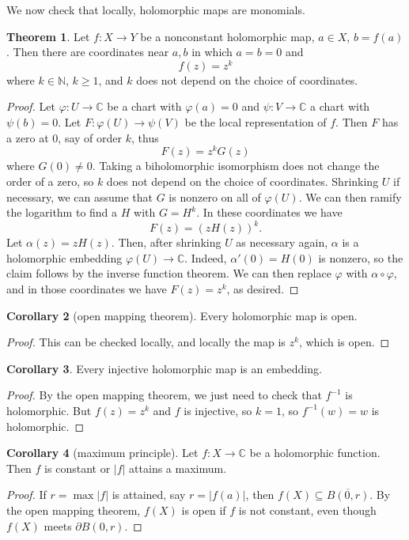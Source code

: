 \documentclass[12pt]{book}
\newcommand{\NN}{\mathbb{N}}
\newcommand{\CC}{\mathbb{C}}
\theoremstyle{definition}
\newtheorem{theorem}{Theorem}[chapter]
\newtheorem{corollary}[theorem]{Corollary}
\begin{document}
We now check that locally, holomorphic maps are monomials.

\begin{theorem}
Let $f: X \to Y$ be a nonconstant holomorphic map, $a \in X$, $b = f(a)$.
Then there are coordinates near $a,b$ in which $a = b = 0$ and
$$f(z) = z^k$$
where $k \in \NN$, $k \geq 1$, and $k$ does not depend on the choice of coordinates.
\end{theorem}
\begin{proof}
Let $\varphi: U \to \CC$ be a chart with $\varphi(a) = 0$ and $\psi: V \to \CC$ a chart with $\psi(b) = 0$.
Let $F: \varphi(U) \to \psi(V)$ be the local representation of $f$.
Then $F$ has a zero at $0$, say of order $k$, thus
$$F(z) = z^k G(z)$$
where $G(0) \neq 0$. Taking a biholomorphic isomorphism does not change the order of a zero, so $k$ does not depend on the choice of coordinates.
Shrinking $U$ if necessary, we can assume that $G$ is nonzero on all of $\varphi(U)$.
We can then ramify the logarithm to find a $H$ with $G = H^k$.
In these coordinates we have
$$F(z) = (zH(z))^k.$$
Let $\alpha(z) = zH(z)$. Then, after shrinking $U$ as necessary again, $\alpha$ is a holomorphic embedding $\varphi(U) \to \CC$.
Indeed, $\alpha'(0) = H(0)$ is nonzero, so the claim follows by the inverse function theorem.
We can then replace $\varphi$ with $\alpha \circ \varphi$, and in those coordinates we have $F(z) = z^k$, as desired.
\end{proof}

\begin{corollary}[open mapping theorem]
Every holomorphic map is open.
\end{corollary}
\begin{proof}
This can be checked locally, and locally the map is $z^k$, which is open.
\end{proof}

\begin{corollary}
Every injective holomorphic map is an embedding.
\end{corollary}
\begin{proof}
By the open mapping theorem, we just need to check that $f^{-1}$ is holomorphic.
But $f(z) = z^k$ and $f$ is injective, so $k = 1$, so $f^{-1}(w) = w$ is holomorphic.
\end{proof}

\begin{corollary}[maximum principle]
Let $f: X \to \CC$ be a holomorphic function. Then $f$ is constant or $|f|$ attains a maximum.
\end{corollary}
\begin{proof}
If $r = \max |f|$ is attained, say $r = |f(a)|$, then $f(X) \subseteq \overline{B(0, r)}$.
By the open mapping theorem, $f(X)$ is open if $f$ is not constant, even though $f(X)$ meets $\partial B(0, r)$.
\end{proof}
\end{document}

